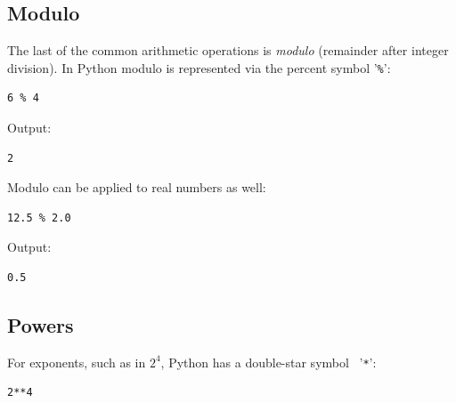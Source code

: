 \documentclass[article,A4,12pt]{llncs}
\begin{document}
\subsection{Modulo}
The last of the common arithmetic operations is {\em modulo} (remainder 
after integer division). In Python modulo is represented via the percent symbol '{\tt \%}':\\

\begin{bbox}
\begin{verbatim}
6 % 4
\end{verbatim}
\end{bbox}
\vspace{6mm}

\noindent
Output:\\

\begin{ybox}
\begin{verbatim}
2
\end{verbatim}
\end{ybox}
\vspace{6mm}

\noindent
Modulo can be applied to real numbers as well:\\

\begin{bbox}
\begin{verbatim}
12.5 % 2.0 
\end{verbatim}
\end{bbox}
\vspace{6mm}

\noindent
Output:\\

\begin{ybox}
\begin{verbatim}
0.5
\end{verbatim}
\end{ybox}
\vspace{6mm}

\noindent

\subsection{Powers}
For exponents, such as in $2^4$, Python has a double-star
symbol \ '{\tt **}':\\

\begin{bbox}
\begin{verbatim}
2**4
\end{verbatim}
\end{bbox}
\vspace{6mm}
\end{document}
